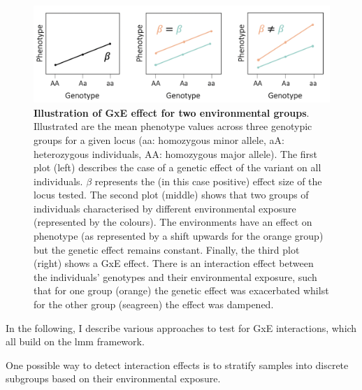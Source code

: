 \begin{figure}[h]
\centering
\includegraphics[width=16cm]{Chapter1/Fig/GxE.png}
\caption[Illustration of GxE]{\textbf{Illustration of GxE effect for two environmental groups}.\\
Illustrated are the mean phenotype values across three genotypic groups for a given locus (aa: homozygous minor allele, aA: heterozygous individuals, AA: homozygous major allele).
The first plot (left) describes the case of a genetic effect of the variant on all individuals. 
$\beta$ represents the (in this case positive) effect size of the locus tested. 
The second plot (middle) shows that two groups of individuals characterised by different environmental exposure (represented by the colours). 
The environments have an effect on phenotype (as represented by a shift upwards for the orange group) but the genetic effect remains constant. 
Finally, the third plot (right) shows a GxE effect.
There is an interaction effect between the individuals' genotypes and their environmental exposure, such that for one group (orange) the genetic effect was exacerbated whilst for the other group (seagreen) the effect was dampened.}
\label{fig:gxe}
\end{figure}

In the following, I describe various approaches to test for GxE interactions, which all build on the \gls{lmm} framework. \\

\newpage


One possible way to detect interaction effects is to stratify samples into discrete subgroups based on their environmental exposure. \\

